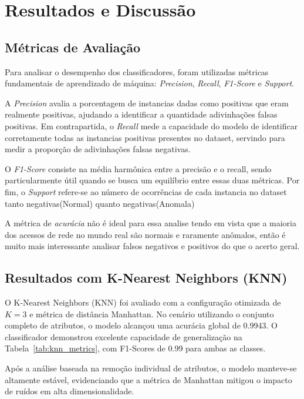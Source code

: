\section{Resultados e Discussão}

\subsection{Métricas de Avaliação}
Para analisar o desempenho dos classificadores, foram utilizadas métricas fundamentais de aprendizado de máquina: \textit{Precision}, \textit{Recall}, \textit{F1-Score} e \textit{Support}.

A \textit{Precision} avalia a porcentagem de instancias dadas como positivas que eram realmente positivas, ajudando a identificar a quantidade adivinhações falsas positivas. Em contrapartida, o \textit{Recall} mede a capacidade do modelo de identificar corretamente todas as instancias positivas presentes no dataset, servindo para medir a proporção de adivinhações falsas negativas.

O \textit{F1-Score} consiste na média harmônica entre a precisão e o recall, sendo particularmente útil quando se busca um equilíbrio entre essas duas métricas. Por fim, o \textit{Support} refere-se ao número de ocorrências de cada instancia no dataset tanto negativas(Normal) quanto negativas(Anomala)

A métrica de \textit{acurácia} não é ideal para essa analise tendo em vista que a maioria dos acessos de rede no mundo real são normais e raramente anômalos, então é muito mais interessante analisar falsos negativos e positivos do que o acerto geral.

\subsection{Resultados com K-Nearest Neighbors (KNN)}

O K-Nearest Neighbors (KNN) foi avaliado com a configuração otimizada de $K=3$ e métrica de distância 
Manhattan. No cenário utilizando o conjunto completo de atributos, o modelo alcançou uma acurácia global 
de 0.9943. O classificador demonstrou excelente capacidade de generalização na Tabela~\ref{tab:knn_metrics}, 
com F1-Scores de 0.99 para ambas as classes. 

Após a análise baseada na remoção individual de atributos, o modelo manteve-se altamente estável, 
evidenciando que a métrica de Manhattan mitigou o impacto de ruídos em alta dimensionalidade.

